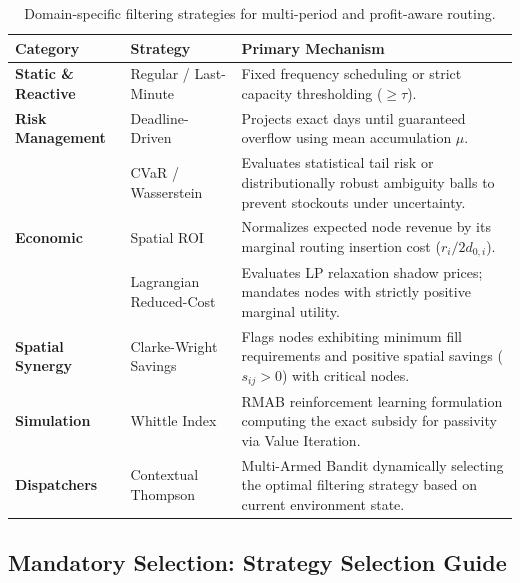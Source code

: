 \documentclass{article}
\begin{document}
\begin{table}[H]
    \centering
    \caption{Domain-specific filtering strategies for multi-period and profit-aware routing.}
    \begin{tabularx}{\textwidth}{@{} l l X @{}}
        \toprule
        \textbf{Category} & \textbf{Strategy} & \textbf{Primary Mechanism} \\
        \midrule
        \textbf{Static \& Reactive} & Regular / Last-Minute & Fixed frequency scheduling or strict capacity thresholding ($\ge \tau$). \\
        \textbf{Risk Management} & Deadline-Driven & Projects exact days until guaranteed overflow using mean accumulation $\mu$. \\
        & CVaR / Wasserstein & Evaluates statistical tail risk or distributionally robust ambiguity balls to prevent stockouts under uncertainty. \\
        \textbf{Economic} & Spatial ROI & Normalizes expected node revenue by its marginal routing insertion cost ($r_i / 2d_{0,i}$). \\
        & Lagrangian Reduced-Cost & Evaluates LP relaxation shadow prices; mandates nodes with strictly positive marginal utility. \\
        \textbf{Spatial Synergy} & Clarke-Wright Savings & Flags nodes exhibiting minimum fill requirements and positive spatial savings ($s_{ij} > 0$) with critical nodes. \\
        \textbf{Simulation} & Whittle Index & RMAB reinforcement learning formulation computing the exact subsidy for passivity via Value Iteration. \\
        \textbf{Dispatchers} & Contextual Thompson & Multi-Armed Bandit dynamically selecting the optimal filtering strategy based on current environment state. \\
        \bottomrule
    \end{tabularx}
\end{table}

\subsection*{Mandatory Selection: Strategy Selection Guide}
\end{document}
